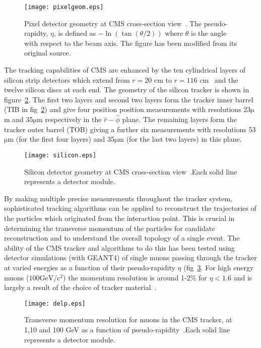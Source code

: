 \documentclass[a4paper,10pt]{article}
\begin{document}
 \begin{figure}[!ht]
 			\centering
 			\texttt{[image: pixelgeom.eps]}
 			\caption{Pixel detector geometry at CMS cross-section view~\cite{cmsdetector}. The pseudo-rapidty, $\eta$, is defined as $-\ln(\tan(\theta/2))$ where $\theta$ is
				  the angle with respect to the beam axis. The figure has been modified from its original source.}
   \label{fig:pixgeom}
\end{figure}

The tracking capabilities of CMS are enhanced by the ten cylindrical layers of silicon strip detectors which extend from $r=20$ cm to $r=116$ cm~\cite{cmsdetector} and the twelve silicon discs at each end. 
The geometry of the silicon tracker is shown in figure~\ref{fig:silicon}. The first two layers and second two layers form the tracker inner barrel (TIB in fig~\ref{fig:silicon}) and give four position
position measurements with resolutions 23$\mathrm{\mu}$m and 35$\mathrm{\mu}$m respectively in the $\hat{r}-\hat{\phi}$ plane. The remaining layers form the tracker outer barrel (TOB) giving a further 
six measurements with resolutions 53$\mathrm{\mu}$m (for the first four layers) and 35$\mathrm{\mu}$m (for the last two layers) in this plane.

 \begin{figure}[!ht]
 			\centering
 			\texttt{[image: silicon.eps]}
 			\caption{Silicon detector geometry at CMS cross-section view~\cite{cmsdetector}.Each solid line represents a detector module.}
   \label{fig:silicon}
\end{figure}

By making multiple precise measurements throughout the tracker system, sophisticated tracking algorithms can be applied to reconstruct the trajectories of the particles which originated from the interaction
point. This is crucial in determining the transverse momentum of the particles for candidate reconstruction and to understand the overall topology of a single event. The ability of the CMS tracker 
and algorithms to do this has been tested using detector simulations (with GEANT4) of single muons passing through the tracker
at varied energies as a function of their pseudo-rapidity $\eta$ (fig~\ref{fig:delp}. For high energy muons ($100 \mathrm{GeV/c^2}$) the momentum resolution is around 1-2\% for $\eta < 1.6$ and is 
largely a result of the choice of tracker material~\cite{TDR1}.
 
 \begin{figure}[!ht]
 			\centering
 			\texttt{[image: delp.eps]}
 			\caption{Transverse momentum resolution for muons in the CMS tracker, at 1,10 and 100 GeV as a function of pseudo-rapidity~\cite{TDR1}.Each solid line represents a detector module.}
   \label{fig:delp}
\end{figure}
\end{document}
